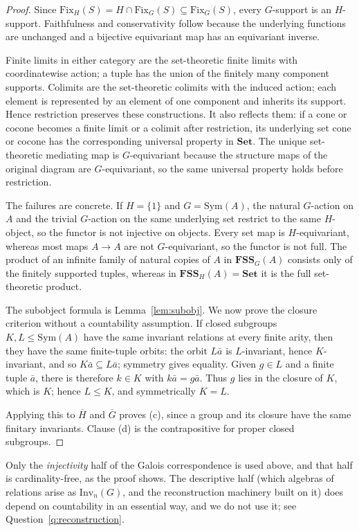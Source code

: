 \documentclass{lmcs}
\newcommand{\Sym}{\mathrm{Sym}}
\newcommand{\Fix}{\mathrm{Fix}}
\newcommand{\Inv}{\mathrm{Inv}}
\newcommand{\FSS}{\mathbf{FSS}}
\newcommand{\Set}{\mathbf{Set}}
\begin{document}
\begin{proof}
Since
$\Fix_H(S)=H\cap\Fix_G(S)\subseteq\Fix_G(S)$, every $G$-support is
an $H$-support. Faithfulness and conservativity follow because the
underlying functions are unchanged and a bijective equivariant map
has an equivariant inverse.

Finite limits in either category are the set-theoretic finite limits
with coordinatewise action; a tuple has the union of the finitely many
component supports. Colimits are the set-theoretic colimits with the
induced action; each element is represented by an element of one
component and inherits its support. Hence restriction preserves these
constructions. It also reflects them: if a cone or cocone becomes a
finite limit or a colimit after restriction, its underlying set cone or
cocone has the corresponding universal property in $\Set$. The unique
set-theoretic mediating map is $G$-equivariant because the structure
maps of the original diagram are $G$-equivariant, so the same universal
property holds before restriction.

The failures are concrete. If $H=\{1\}$ and $G=\Sym(A)$, the natural
$G$-action on $A$ and the trivial $G$-action on the same underlying set
restrict to the same $H$-object, so the functor is not injective on
objects. Every set map is $H$-equivariant, whereas most maps
$A\to A$ are not $G$-equivariant, so the functor is not full. The
product of an infinite family of natural copies of $A$ in
$\FSS_G(A)$ consists only of the finitely supported tuples, whereas in
$\FSS_H(A)=\Set$ it is the full set-theoretic product.

The subobject formula is Lemma~\ref{lem:subobj}. We now prove the
closure criterion without a countability assumption. If closed
subgroups $K,L\leq\Sym(A)$ have the same invariant relations at every
finite arity, then they have the same finite-tuple orbits: the orbit
$L\bar a$ is $L$-invariant, hence $K$-invariant, and so
$K\bar a\subseteq L\bar a$; symmetry gives equality. Given
$g\in L$ and a finite tuple $\bar a$, there is therefore $k\in K$
with $k\bar a=g\bar a$. Thus $g$ lies in the closure of $K$, which
is $K$; hence $L\leq K$, and symmetrically $K=L$.

Applying this to $\overline H$ and $\overline G$ proves (c), since a
group and its closure have the same finitary invariants. Clause (d)
is the contrapositive for proper closed subgroups.
\end{proof}

\begin{rem}\label{rem:noctble}
Only the \emph{injectivity} half of the Galois correspondence is used above, and that half is cardinality-free, as the proof shows. The descriptive half (which algebras of relations arise as $\Inv_n(G)$, and the reconstruction machinery built on it) does depend on countability in an essential way, and we do not use it; see Question~\ref{q:reconstruction}.
\end{rem}
\end{document}
